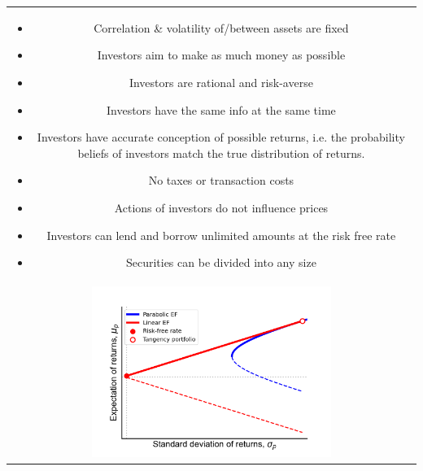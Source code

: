 \documentclass[10pt,landscape]{article}
\begin{document}
\begin{multicols}{3}
\begin{tcolorbox}[boxsep=0pt, left=0pt, right=0pt, top=0pt, bottom=0pt]
\begin{tabular}{p{2cm} p{5cm}}
            \multicolumn{2}{c}{\begin{minipage}{7.5cm}
                                       \begin{itemize}
                        \item Correlation \& volatility of/between assets are fixed
                        \item Investors aim to make as much money as possible
                        \item Investors are rational and risk-averse
                        \item Investors have the same info at the same time
                        \item Investors have accurate conception of possible returns, i.e. the probability beliefs of investors match the true distribution of returns.
                        \item No taxes or transaction costs
                        \item Actions of investors do not influence prices
                        \item Investors can lend and borrow unlimited amounts at the risk free rate
                        \item Securities can be divided into any size
                    \end{itemize}
                                   \end{minipage}}                                                                                                                                                                                                                            \\
            \multicolumn{2}{c}{\includegraphics[width=0.6\textwidth]{LECTURE_4/CML.png}}                                                                                                                                                                                           \\

\end{tabular}
\end{tcolorbox}
\end{multicols}
\end{document}
